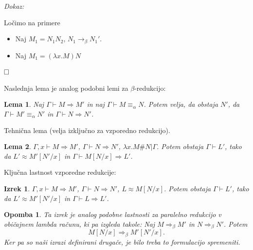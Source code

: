 \documentclass{article}
\def\qed{$\hfill\Box$}   %
\newtheorem{izrek}{Izrek}
\newtheorem{lema}{Lema}
\newtheorem{opomba}{Opomba}
\begin{document}

\noindent
{\em Dokaz:\/}

Ločimo na primere

\begin{itemize}
    \item Naj \(M_1 = N_1N_2\), \(N_1 \rightarrow_\beta N_1'\).
    
    
    \item Naj \(M_1 = (\lambda x. M) N\)
\end{itemize}


\qed

Naslednja lema je analog podobni lemi za \(\beta\)-redukcijo:
\begin{lema}
    Naj \(\Gamma \vdash M \Rightarrow M'\) in naj
    \(\Gamma \vdash M \equiv_\alpha N\).
    Potem velja, da obstaja \(N'\), da \(\Gamma \vdash M' \equiv_\alpha N' \) in \(\Gamma \vdash N \Rightarrow N'\).
\end{lema}

Tehnična lema (velja izključno za vzporedno redukcijo).

\begin{lema}
    \(\Gamma, x \vdash M \Rightarrow M'\), \(\Gamma \vdash N \Rightarrow N'\), \(\lambda x. M \# N | \Gamma\). Potem obstaja \(\Gamma \vdash L'\), tako da \(L' \approx M'[N'/x]\) in \(\Gamma \vdash M[N/x] \Rightarrow L'\).
\end{lema}

Ključna lastnost vzporedne redukcije:

\begin{izrek}
    \(\Gamma, x \vdash M \Rightarrow M'\), \(\Gamma \vdash N \Rightarrow N'\), \(L \approx M[N/x]\). Potem obstaja \(\Gamma \vdash L'\), tako da \(L' \approx M'[N'/x]\) in \(\Gamma \vdash L \Rightarrow L'\).
\end{izrek}

\begin{opomba}
    Ta izrek je analog podobne lastnosti za paralelno redukcijo v običajnem lambda računu, ki pa izgleda takole:
    Naj \(M \Rightarrow_\beta M'\) in \(N \Rightarrow_\beta N'\). Potem
    \[
        M[N/x] \Rightarrow_\beta M'[N'/x].
    \]
    Ker pa so naši izrazi definirani drugače, je bilo treba to formulacijo spremeniti.
\end{opomba}
\end{document}
